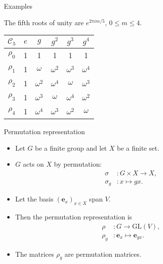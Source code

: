 \documentclass[handout, 10pt]{beamer}
\newcommand{\GL}{\text{GL}}
\newcommand{\Cyc}{\mathcal{C}}
\newcommand{\bas}{\mathbf{e}}
\begin{document}
\begin{frame}[allowframebreaks]{Examples}
		\begin{example}[$\Cyc_5$]
			The fifth roots of unity are $e^{{2\pi im}/{5}}$, $0 \leq m \leq 4$.
			\begin{table}
				\centering
				\begin{tabular}{c | c c c c c}
					$\Cyc_5$ & $e$ & $g$        & $g^2$      & $g^3$      & $g^4$      \\ \hline
					$\rho_0$            & 1   & 1          & 1          & 1          & 1          \\
					$\rho_1$            & 1   & $\omega$ & $\omega^2$ & $\omega^3$ & $\omega^4$ \\
					$\rho_2$            & 1   & $\omega^2$ & $\omega^4$ & $\omega$ & $\omega^3$ \\
					$\rho_3$            & 1   & $\omega^3$ & $\omega$ & $\omega^4$ & $\omega^2$ \\
					$\rho_4$            & 1   & $\omega^4$ & $\omega^3$ & $\omega^2$ & $\omega$
				\end{tabular}
			\end{table}
		\end{example}

		\begin{block}{Permutation representation}
			\begin{itemize}
				\item Let $G$ be a finite group and let $X$ be a finite set.
				
				\item $G$ acts on $X$ by permutation:
				\begin{align*}
					\sigma &: G \times X \rightarrow X, \\
					\sigma_g &: x \mapsto gx.
				\end{align*}
				
				\item Let the basis $(\bas_x)_{x \in X}$ span $V$.
				
				\item Then the permutation representation is
				\begin{align*}
					\rho &: G \rightarrow \GL(V), \\
					\rho_g &: \bas_x \mapsto \bas_{gx}.
				\end{align*}
				
				\item The matrices $\rho_g$ are \alert{permutation matrices}.
			\end{itemize}
		\end{block}
		

\end{frame}
\end{document}
